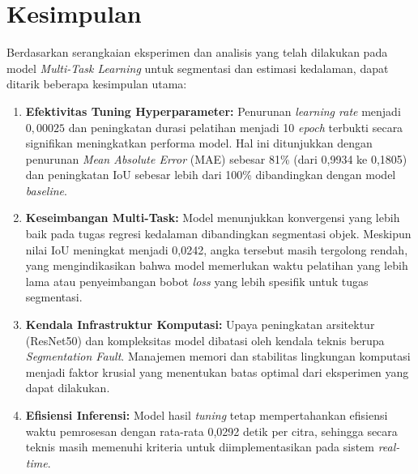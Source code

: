 \documentclass[12pt, a4paper]{article}
\begin{document}
\section{Kesimpulan}

Berdasarkan serangkaian eksperimen dan analisis yang telah dilakukan pada model \textit{Multi-Task Learning} untuk segmentasi dan estimasi kedalaman, dapat ditarik beberapa kesimpulan utama:
\begin{enumerate}
    \item \textbf{Efektivitas Tuning Hyperparameter:} Penurunan \textit{learning rate} menjadi $0,00025$ dan peningkatan durasi pelatihan menjadi 10 \textit{epoch} terbukti secara signifikan meningkatkan performa model. Hal ini ditunjukkan dengan penurunan \textit{Mean Absolute Error} (MAE) sebesar 81\% (dari 0,9934 ke 0,1805) dan peningkatan IoU sebesar lebih dari 100\% dibandingkan dengan model \textit{baseline}.
    \item \textbf{Keseimbangan Multi-Task:} Model menunjukkan konvergensi yang lebih baik pada tugas regresi kedalaman dibandingkan segmentasi objek. Meskipun nilai IoU meningkat menjadi 0,0242, angka tersebut masih tergolong rendah, yang mengindikasikan bahwa model memerlukan waktu pelatihan yang lebih lama atau penyeimbangan bobot \textit{loss} yang lebih spesifik untuk tugas segmentasi.
    \item \textbf{Kendala Infrastruktur Komputasi:} Upaya peningkatan arsitektur (ResNet50) dan kompleksitas model dibatasi oleh kendala teknis berupa \textit{Segmentation Fault}. Manajemen memori dan stabilitas lingkungan komputasi menjadi faktor krusial yang menentukan batas optimal dari eksperimen yang dapat dilakukan.
    \item \textbf{Efisiensi Inferensi:} Model hasil \textit{tuning} tetap mempertahankan efisiensi waktu pemrosesan dengan rata-rata 0,0292 detik per citra, sehingga secara teknis masih memenuhi kriteria untuk diimplementasikan pada sistem \textit{real-time}.
\end{enumerate}
\end{document}
